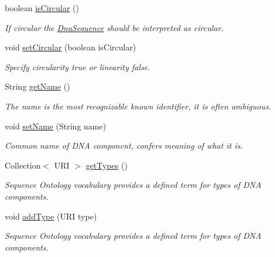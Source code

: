 \begin{DoxyCompactItemize}
boolean \hyperlink{classorg_1_1sbolstandard_1_1lib_s_b_o_lj_1_1_dna_component_ae8ce8039c52384b14ce23f816e7181d4}{isCircular} ()
\begin{DoxyCompactList}\small\item\em If circular the \hyperlink{classorg_1_1sbolstandard_1_1lib_s_b_o_lj_1_1_dna_sequence}{DnaSequence} should be interpreted as circular. \item\end{DoxyCompactList}\item 
void \hyperlink{classorg_1_1sbolstandard_1_1lib_s_b_o_lj_1_1_dna_component_a6534e208dd1b57a6610afb9d26eb68fa}{setCircular} (boolean isCircular)
\begin{DoxyCompactList}\small\item\em Specify circularity {\ttfamily true} or linearity {\ttfamily false}. \item\end{DoxyCompactList}\item 
String \hyperlink{classorg_1_1sbolstandard_1_1lib_s_b_o_lj_1_1_dna_component_acb8e59ea7c54aa9a3412564784ccaa7e}{getName} ()
\begin{DoxyCompactList}\small\item\em The name is the most recognizable known identifier, it is often ambiguous. \item\end{DoxyCompactList}\item 
void \hyperlink{classorg_1_1sbolstandard_1_1lib_s_b_o_lj_1_1_dna_component_af3da1d3c7be4ae6bd71fc20145d1db05}{setName} (String name)
\begin{DoxyCompactList}\small\item\em Common name of DNA component, confers meaning of what it is. \item\end{DoxyCompactList}\item 
Collection$<$ URI $>$ \hyperlink{classorg_1_1sbolstandard_1_1lib_s_b_o_lj_1_1_dna_component_ab7c26db2517c03db394cd08a628e1d9d}{getTypes} ()
\begin{DoxyCompactList}\small\item\em Sequence Ontology vocabulary provides a defined term for types of DNA components. \item\end{DoxyCompactList}\item 
void \hyperlink{classorg_1_1sbolstandard_1_1lib_s_b_o_lj_1_1_dna_component_a9c98ced4a045dbdf60d4c09f1025df9a}{addType} (URI type)
\begin{DoxyCompactList}\small\item\em Sequence Ontology vocabulary provides a defined term for types of DNA components. \item\end{DoxyCompactList}\item 

\end{DoxyCompactItemize}
